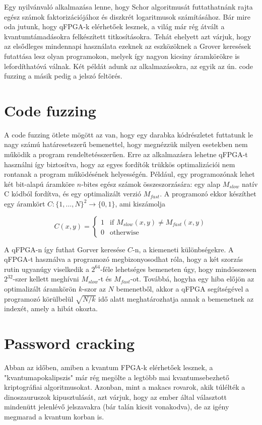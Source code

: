 \indent Egy nyilvánvaló alkalmazása lenne, hogy Schor algoritmusát futtathatnánk rajta egész számok faktorizációjához és diszkrét logaritmusok számításához.
Bár mire oda jutunk, hogy qFPGA-k elérhetőek lesznek, a világ már rég átvált a kvantumtámadásokra felkészített titkosításokra.
Tehát ehelyett azt várjuk, hogy az elsődleges mindennapi használata ezeknek az eszközöknek a Grover keresések futattása lesz olyan programokon, melyek így nagyon kicsiny áramkörökre is lefordíthatóvá válnak.
Két példát adunk az alkalmazásokra, az egyik az ún. code fuzzing  a másik pedig a jelszó feltörés.
\section{Code fuzzing}

\indent A code fuzzing ötlete mögött az van, hogy egy darabka kódrészletet futtatunk le nagy számú határesetszerű bemenettel, hogy megnézzük milyen esetekben nem működik a program rendeltetésszerűen.
Erre az alkalmazásra lehetne qFPGA-t használni így biztosítva, hogy az egyes fordítók trükkös optimalizációi nem rontanak a program  működésének helyességén.
Például, egy programozónak  lehet két bit-alapú áramköre $n$-bites egész számok összeszorzására: egy alap $M_{slow}$ natív C kódból fordítva, és egy optimalizált verzió $M_{fast}$.
A programozó ekkor készíthet egy áramkört $C:\{1,...,N\}^2 \rightarrow \{0,1\}$, ami kiszámolja

$$C(x,y)=
		\begin{cases}
		1 & \text{if } M_{slow}(x,y)\neq M_{fast}(x,y)\\
		0 & \text{otherwise}
		\end{cases}
$$

A qFPGA-n így futhat Gorver keresése $C$-n, a kiemeneti különbségekre.
\indent A qFPGA-t használva a programozó megbizonyosodhat róla, hogy a két szorzás rutin ugyanúgy viselkedik a $2^{64}$-féle lehetséges bemeneten úgy, hogy mindösszesen $2^{32}$-szer kellett meghívni $M_{slow}$-t és $M_{fast}$-ot.
Továbbá, hogyha egy hiba előjön az optimalizált áramkörön $k$-szor az $N$ bemenetből, akkor a qFPGA segítségével a programozó körülbelül $\sqrt{N/k}$ idő alatt meghatározhatja annak a bemenetnek az indexét, amely a hibát okozta.
\section{Password cracking}
\indent Abban az időben, amiben a kvantum FPGA-k elérhetőek lesznek, a "kvantumapokalipszis" már rég megölte a legtöbb mai kvantumsebezhető kriptográfiai algoritmusokat.
Azonban, mint a makacs rovarok, akik túlélték a dinoszauruszok kipusztulását, azt várjuk, hogy az ember által választott mindenütt jelenlévő jelszavakra (bár talán kicsit vonakodva), de az igény megmarad a kvantum korban is.

